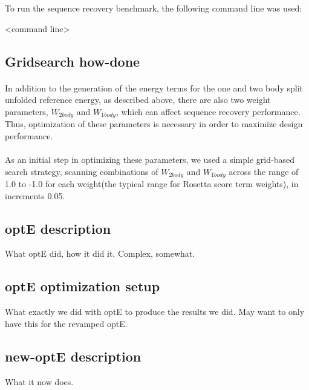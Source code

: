 To run the sequence recovery benchmark, the following command line was used:

<command line>



\subsection{Gridsearch how-done}
\paragraph{}
In addition to the generation of the energy terms for the one and two body split unfolded reference energy, as described above, there are also two weight parameters, $W_{2body}$ and $W_{1body}$, which can affect sequence recovery performance. Thus, optimization of these parameters is necessary in order to maximize design performance. 

\paragraph{}
As an initial step in optimizing these parameters, we used a simple grid-based search strategy, scanning combinations of $W_{2body}$ and $W_{1body}$ across the range of 1.0 to -1.0 for each weight(the typical range for Rosetta score term weights), in increments 0.05.


\subsection{optE description}
What optE did, how it did it. Complex, somewhat.

\subsection{optE optimization setup}
What exactly we did with optE to produce the results we did. May want to only have this for the revamped optE.

\subsection{new-optE description}
What it now does.
